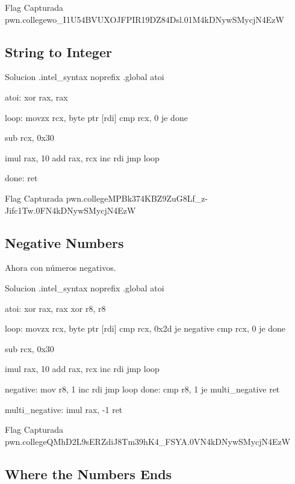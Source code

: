 \begin{flagbox}{Flag Capturada}
	pwn.college{wo_I1U54BVUXOJFPIR19DZ84Dsl.01M4kDNywSMycjN4EzW}
\end{flagbox}
\subsection{String to Integer}\label{subsec:11-03string_to_integer}
\begin{codebox}[ASM]{Solucion}
	.intel_syntax noprefix
	.global atoi

	atoi:
	xor rax, rax

	loop:
	movzx rcx, byte ptr [rdi]
	cmp rcx, 0
	je done

	sub rcx, 0x30

	imul rax, 10
	add rax, rcx
	inc rdi
	jmp loop

	done:
	ret
\end{codebox}
\begin{flagbox}{Flag Capturada}
	pwn.college{MPBk374KBZ9ZuG8Lf_z-Jifc1Tw.0FN4kDNywSMycjN4EzW}
\end{flagbox}
\subsection{Negative Numbers}\label{subsec:11-04negative_numbers}

Ahora con números negativos.

\begin{codebox}[ASM]{Solucion}
	.intel_syntax noprefix
	.global atoi

	atoi:
	xor rax, rax
	xor r8, r8

	loop:
	movzx rcx, byte ptr [rdi]
	cmp rcx, 0x2d
	je negative
	cmp rcx, 0
	je done

	sub rcx, 0x30

	imul rax, 10
	add rax, rcx
	inc rdi
	jmp loop

	negative:
	mov r8, 1
	inc rdi
	jmp loop
	done:
	cmp r8, 1
	je multi_negative
	ret

	multi_negative:
	imul rax, -1
	ret
\end{codebox}

\begin{flagbox}{Flag Capturada}
	pwn.college{QMhD2L9sERZdiJ8Tm39hK4_FSYA.0VN4kDNywSMycjN4EzW}
\end{flagbox}

\subsection{Where the Numbers Ends}\label{subsec:11-05where_the_numbers_ends}
